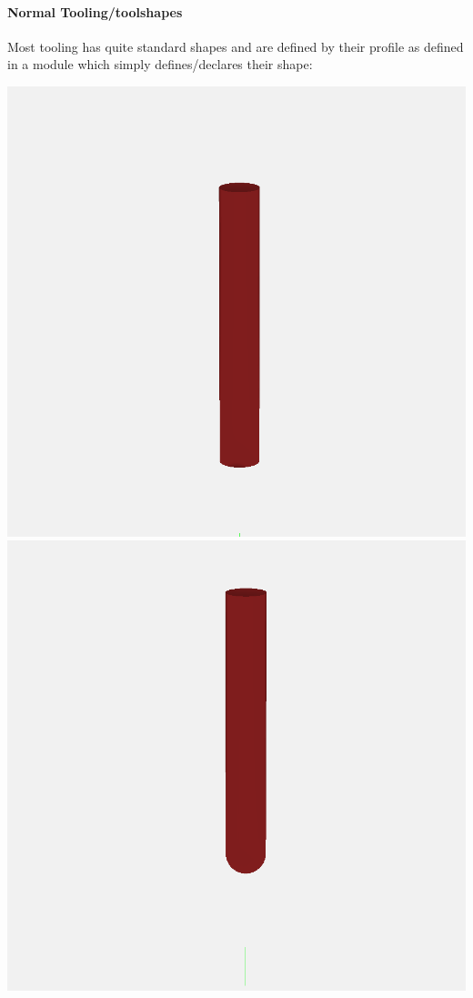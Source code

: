 \documentclass{ltxdoc}
\begin{document}
\begin{samepage}
\paragraph{Normal Tooling/toolshapes}

\label{para:normaltooling} Most tooling has quite standard shapes 
and are defined by their profile as defined in a module which simply defines/declares their shape:

  \noindent\includegraphics[width=\linewidth/3]{images/tool_square_201.png}%
           \includegraphics[width=\linewidth/3]{images/tool_ball_202.png}%

\end{samepage}
\end{document}
